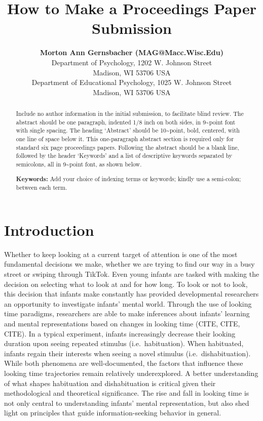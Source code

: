 \documentclass[10pt, letterpaper]{article}
\title{How to Make a Proceedings Paper Submission}
\author{{\large \bf Morton Ann Gernsbacher (MAG@Macc.Wisc.Edu)} \\ Department of Psychology, 1202 W. Johnson Street \\ Madison, WI 53706 USA \AND {\large \bf Sharon J.~Derry (SDJ@Macc.Wisc.Edu)} \\ Department of Educational Psychology, 1025 W. Johnson Street \\ Madison, WI 53706 USA}
\begin{document}
\maketitle

\begin{abstract}
Include no author information in the initial submission, to facilitate
blind review. The abstract should be one paragraph, indented 1/8 inch on
both sides, in 9\textasciitilde point font with single spacing. The
heading `Abstract' should be 10\textasciitilde point, bold, centered,
with one line of space below it. This one-paragraph abstract section is
required only for standard six page proceedings papers. Following the
abstract should be a blank line, followed by the header `Keywords' and a
list of descriptive keywords separated by semicolons, all in
9\textasciitilde point font, as shown below.

\textbf{Keywords:}
Add your choice of indexing terms or keywords; kindly use a semi-colon;
between each term.
\end{abstract}

\hypertarget{introduction}{%
\section{Introduction}\label{introduction}}

Whether to keep looking at a current target of attention is one of the
most fundamental decisions we make, whether we are trying to find our
way in a busy street or swiping through TikTok. Even young infants are
tasked with making the decision on selecting what to look at and for how
long. To look or not to look, this decision that infants make constantly
has provided developmental researchers an opportunity to investigate
infants' mental world. Through the use of looking time paradigms,
researchers are able to make inferences about infants' learning and
mental representations based on changes in looking time (CITE, CITE,
CITE). In a typical experiment, infants increasingly decrease their
looking duration upon seeing repeated stimulus (i.e.~habituation). When
habituated, infants regain their interests when seeing a novel stimulus
(i.e.~dishabituation). While both phenomena are well-documented, the
factors that influence these looking time trajectories remain relatively
underexplored. A better understanding of what shapes habituation and
dishabituation is critical given their methodological and theoretical
significance. The rise and fall in looking time is not only central to
understanding infants' mental representation, but also shed light on
principles that guide information-seeking behavior in general.
\end{document}
